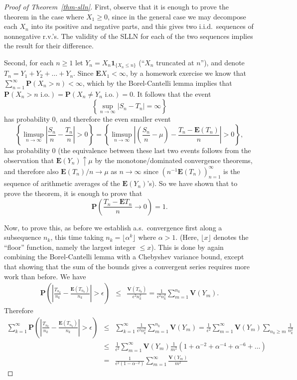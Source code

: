 \documentclass[12pt]{article}
\newcommand{\prob}{\mathbf{P}}
\newcommand{\expec}{\mathbf{E}}
\newcommand{\var}{\mathbf{V}}
\newcommand{\ind}{\textbf{1}}
\theoremstyle{example}
\begin{document}
\begin{proof}[Proof of Theorem~\ref{thm-slln}]
First, observe that it is enough to prove the theorem in the case where $X_1\ge 0$, since in the general case we may decompose each $X_n$ into its positive and negative parts, and this gives two i.i.d.\ sequences of nonnegative r.v.'s. The validity of the SLLN for each of the two sequences implies the result for their difference.

Second, for each $n\ge 1$ let $Y_n = X_n \ind_{\{X_n\le n\}}$ (``$X_n$ truncated at $n$''), and denote $T_n=Y_1+Y_2+\ldots +Y_n$. 
Since $\expec X_1<\infty$, by a homework exercise we know that 
$\sum_{n=1}^\infty \prob(X_n> n)<\infty$, 
which by the Borel-Cantelli lemma implies that $\prob(X_n>n\textrm{ i.o.}) = \prob(X_n\neq Y_n\textrm{ i.o.}) = 0$. It follows that the event
$$ 
\left\{ \sup_{n\to\infty} |S_n-T_n|=\infty \right\}
$$
has probability 0, and therefore the even smaller event
$$ \left\{ \limsup_{n\to\infty} \left|\frac{S_n}{n}-\frac{T_n}{n} \right|>0 \right\}=
\left\{ \limsup_{n\to\infty} \left|\left(\frac{S_n}{n}-\mu\right)-\frac{T_n-\expec(T_n)}{n} \right|>0 \right\},
$$
has probability 0 (the equivalence between these last two events follows from the observation that $\expec(Y_n)\uparrow \mu$ by the monotone/dominated convergence theorems, and therefore also $\expec(T_n)/n\to\mu$ as $n\to\infty$ since $(n^{-1} \expec(T_n))_{n=1}^\infty$ is the sequence of arithmetic averages of the $\expec(Y_n)$'s).
So we have shown that to prove the theorem, it is enough to prove that $$\prob\left(\frac{T_n-\expec T_n}{n}\to0\right) = 1.$$

Now, to prove this, as before we establish a.s.\ convergence first along a subsequence $n_k$, this time taking $n_k = \lfloor \alpha^k \rfloor$ where $\alpha>1$. (Here, $\lfloor x\rfloor$ denotes the ``floor'' function, namely the largest integer $\le x$). This is done by again combining the Borel-Cantelli lemma with a Chebyshev variance bound, except that showing that the sum of the bounds gives a convergent series requires more work than before. We have
\begin{eqnarray*}
\prob\left(\left|\frac{T_{n_k}}{n_k} - \frac{\expec(T_{n_k})}{n_k}\right| > \epsilon\right)
&\le&
\frac{\var(T_{n_k})}{\epsilon^2 n_k^2}
= \frac{1}{\epsilon^2 n_k^2} \sum_{m=1}^{n_k} \var(Y_m).
\end{eqnarray*}
Therefore
\begin{eqnarray}
\sum_{k=1}^\infty
\prob\left(\left|\frac{T_{n_k}}{n_k} - \frac{\expec(T_{n_k})}{n_k}\right| > \epsilon\right)
&\le&
\sum_{k=1}^\infty  \frac{1}{\epsilon^2 n_k^2} \sum_{m=1}^{n_k} \var(Y_m) 
= \frac{1}{\epsilon^2} \sum_{m=1}^\infty \var(Y_m) \sum_{n_k\ge m} \frac{1}{n_k^2}
\nonumber \\
&\le&
\frac{1}{\epsilon^2} \sum_{m=1}^\infty \var(Y_m) \frac{1}{m^2}(1+\alpha^{-2}+\alpha^{-4}+\alpha^{-6}+\ldots)
\nonumber \\
&=&
\frac{1}{\epsilon^2(1-\alpha^{-2})} \sum_{m=1}^\infty  \frac{\var(Y_m)}{m^2}
\label{eq:infinitesum}
\end{eqnarray}


\end{proof}
\end{document}
